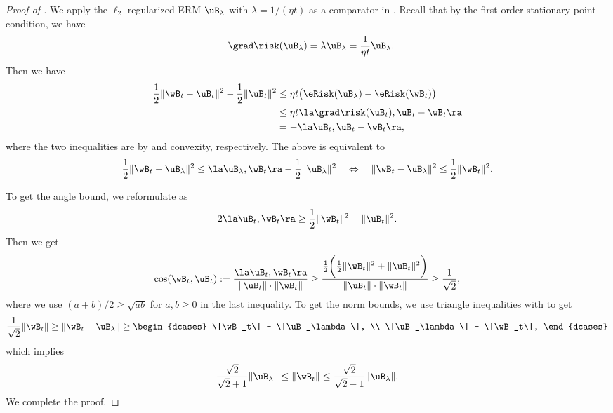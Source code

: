 \documentclass[11pt]{article}
\begin{document}
\begin{proof}[Proof of ]
We apply the $\ell_2$-regularized ERM $\uB_{\lambda}$ with $\lambda= 1/(\eta t)$ as a comparator in . 
Recall that by the first-order stationary point condition, we have 
\begin{align*}
    -\grad \risk(\uB_\lambda)  = \lambda \uB_\lambda = \frac{1}{\eta t} \uB_\lambda.
\end{align*}
Then we have 
\begin{align*}
    \frac{1}{2}\|\wB_t - \uB_t\|^2 - \frac{1}{2}\|\uB_t\|^2 
    &\le \eta t \big( \eRisk(\uB_{\lambda}) -  \eRisk(\wB_t)\big) \\
    &\le \eta t \la \grad \risk(\uB_t), \uB_t -\wB_t \ra \\
    &= -\la  \uB_t, \uB_t-\wB_t \ra,
\end{align*}
where the two inequalities are by  and convexity, respectively.
The above is equivalent to 
\begin{equation}\label{eq:opt-vs-regu-path}
   \frac{1}{2} \|\wB_t-\uB_\lambda \|^2 \le \la \uB_\lambda , \wB_t\ra - \frac{1}{2}\|\uB_\lambda \|^2 \quad \Leftrightarrow\quad   \|\wB_t-\uB_\lambda\|^2 \le \frac{1}{2} \|\wB_t\|^2.
\end{equation}

To get the angle bound, we reformulate  as 
\begin{align*}
    2 \la\uB_t,\wB_t \ra \ge \frac{1}{2}\|\wB_t\|^2 + \|\uB_t\|^2. 
\end{align*}
Then we get
\begin{align*}
    \cos(\wB_t, \uB_t) := \frac{\la \uB_t, \wB_t\ra }{\|\uB_t\| \cdot \|\wB_t\|} 
    \ge \frac{\frac{1}{2}\bigg(\frac{1}{2}\|\wB_t\|^2 + \|\uB_t\|^2\bigg)}{\|\uB_t\| \cdot \|\wB_t\|} 
    \ge \frac{1}{\sqrt{2}},
\end{align*}
where we use $(a+b)/2\ge \sqrt{ab}$ for $a,b\ge 0$ in the last inequality.
To get the norm bounds, we use triangle inequalities with  to get 
\begin{align*}
\frac{1}{\sqrt{2}} \|\wB_t\| \ge     \|\wB_t-\uB_\lambda\| \ge \begin{dcases}
    \|\wB_t\| - \|\uB_\lambda\|, \\
    \|\uB_\lambda\| - \|\wB_t\|,
\end{dcases} 
\end{align*}
which implies 
\[
\frac{\sqrt{2}}{\sqrt{2}+1} \|\uB_\lambda\| \le \|\wB_t\|\le \frac{\sqrt{2}}{\sqrt{2}-1}\|\uB_\lambda\|.
\]
We complete the proof.
\end{proof}
\end{document}
